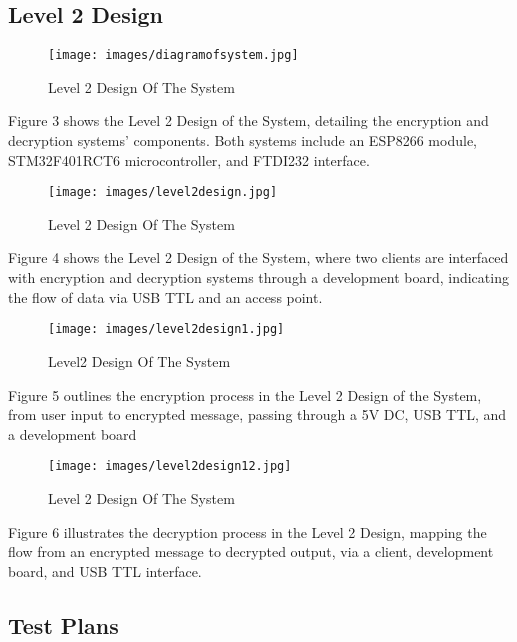 \documentclass[12pt]{article}
\begin{document}
\subsection{Level 2 Design}
	\begin{figure}[H]
	\centering
	\label{ Design Of The System}
	\texttt{[image: images/diagramofsystem.jpg]}\\[0.5 cm]	
	\caption{Level 2 Design Of The System} 		
\end{figure}
Figure 3 shows the Level 2 Design of the System, detailing the encryption and decryption systems' components. Both systems include an ESP8266 module, STM32F401RCT6 microcontroller, and FTDI232 interface.
	\begin{figure}[H]
	\centering
	\label{Level2 Design Of The System}
	\texttt{[image: images/level2design.jpg]}\\[0.5 cm]	
	\caption{Level 2 Design Of The System} 		
\end{figure}
Figure 4 shows the Level 2 Design of the System, where two clients are interfaced with encryption and decryption systems through a development board, indicating the flow of data via USB TTL and an access point.
	\begin{figure}[H]
	\centering
	\label{Level21 Design Of The System}
	\texttt{[image: images/level2design1.jpg]}\\[0.5 cm]	
	\caption{Level2 Design Of The System} 		
\end{figure}
Figure 5 outlines the encryption process in the Level 2 Design of the System, from user input to encrypted message, passing through a 5V DC, USB TTL, and a development board
	\begin{figure}[H]
	\centering
	\label{Level22 Design Of The System}
	\texttt{[image: images/level2design12.jpg]}\\[0.5 cm]	
	\caption{Level 2 Design Of The System} 		
\end{figure}
Figure 6 illustrates the decryption process in the Level 2 Design, mapping the flow from an encrypted message to decrypted output, via a client, development board, and USB TTL interface.
\newpage
\subsection{Test Plans}
\end{document}
